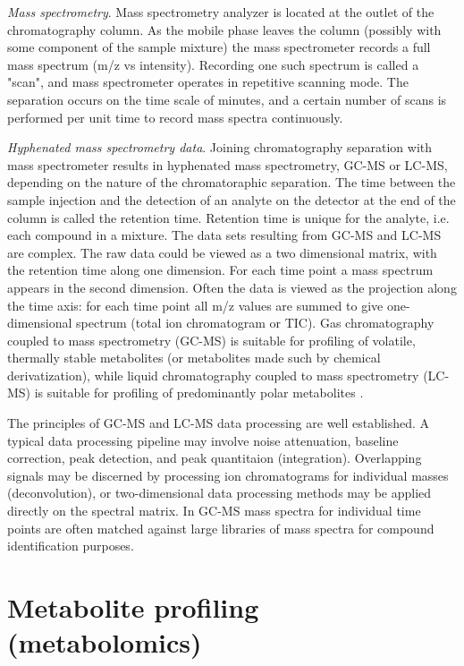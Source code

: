 {\em Mass spectrometry}.
Mass spectrometry analyzer is located at the outlet of the chromatography
column. As the mobile phase leaves the column (possibly with some
component of the sample mixture) the mass spectrometer records a full
mass spectrum (m/z vs intensity). Recording one such spectrum is called
a "scan", and mass spectrometer operates in repetitive scanning mode.
The separation occurs on the time scale of minutes, and a certain number
of scans is performed per unit time to record mass spectra continuously.

{\em Hyphenated mass spectrometry data}.
Joining chromatography separation with mass spectrometer results in
hyphenated mass spectrometry, GC-MS or LC-MS, depending on the nature
of the chromatoraphic separation.
The time between the sample injection and the detection of an analyte
on the detector at the end of the column is called the retention time.
Retention time is unique for the analyte, i.e. each compound in a
mixture. The data sets resulting from GC-MS and LC-MS are complex.
The raw data could be viewed as a two dimensional matrix, with the
retention time along one dimension. For each time point a mass spectrum
appears in the second dimension. Often the data is viewed as the
projection along the time axis: for each time point all m/z values
are summed to give one-dimensional spectrum (total ion chromatogram
or TIC).  Gas chromatography coupled to mass spectrometry (GC-MS) is
suitable for profiling of volatile, thermally stable metabolites (or
metabolites made such by chemical derivatization), while liquid
chromatography coupled to mass spectrometry (LC-MS) is suitable for
profiling of predominantly polar metabolites \cite{halket05}.

The principles of GC-MS and LC-MS data processing are well established.
A typical data processing pipeline may involve noise attenuation,
baseline correction, peak detection, and peak quantitaion (integration).
Overlapping signals may be discerned by processing ion chromatograms
for individual masses (deconvolution), or two-dimensional data
processing methods may be applied directly on the spectral matrix.
In GC-MS mass spectra for individual time points are often matched
against large libraries of mass spectra for compound identification
purposes.

\section{Metabolite profiling (metabolomics)}


